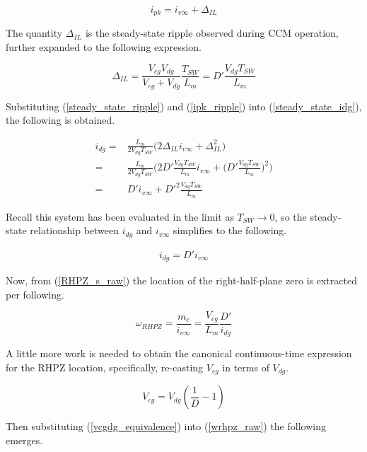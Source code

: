 \documentclass[conference]{IEEEtran}
\begin{document}
\begin{equation}
i_{pk} = i_{v\infty} + \Delta_{IL}
\label{ipk_ripple}
\end{equation}

The quantity $\Delta_{IL}$ is the steady-state ripple observed during CCM operation, further expanded to the following expression.

\begin{equation}
\Delta_{IL} = \frac{V_{cg}V_{dg}}{V_{cg} + V_{dg}} \frac{T_{SW}}{L_m} =
D'\frac{V_{dg} T_{SW}}{L_m}
\label{steady_state_ripple}
\end{equation}

Substituting (\ref{steady_state_ripple}) and (\ref{ipk_ripple}) into (\ref{steady_state_idg}), the following is obtained.

\begin{align}
i_{dg} =& \frac{L_m}{2V_{dg}T_{SW}} \bigg(2\Delta_{IL} i_{v\infty} + \Delta_{IL}^2 \bigg) \nonumber \\
=& \frac{L_m}{2V_{dg}T_{SW}} \bigg(2 D'\frac{V_{dg} T_{SW}}{L_m} i_{v\infty} + \bigg(D'\frac{V_{dg} T_{SW}}{L_m}\bigg)^2\bigg) \nonumber \\
=&  D' i_{v\infty} + D'^2\frac{V_{dg} T_{SW}}{L_m}
\end{align}

Recall this system has been evaluated in the limit as $T_{SW} \to 0$, so the steady-state relationship between $i_{dg}$ and $i_{v\infty}$ simplifies to the following.

\begin{align}
i_{dg} = D' i_{v\infty}
\end{align}

Now, from (\ref{RHPZ_s_raw}) the location of the right-half-plane zero is extracted per following.

\begin{equation}
	\omega_{RHPZ} = \frac{m_c}{i_{v\infty}} = \frac{V_{cg}}{L_m} \frac{D'}{i_{dg}}
	\label{wrhpz_raw}
\end{equation}

A little more work is needed to obtain the canonical continuous-time expression for the RHPZ location, specifically, re-casting $V_{cg}$ in terms of $V_{dg}$.

\begin{equation}
V_{cg} = V_{dg} (\frac{1}{D} - 1)
\label{vcgdg_equivalence}
\end{equation}

Then substituting (\ref{vcgdg_equivalence}) into (\ref{wrhpz_raw}) the following emerges.
\end{document}
